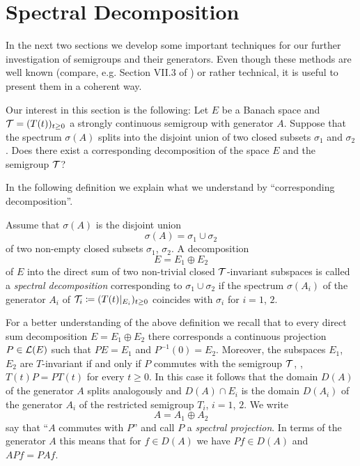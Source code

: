 \section{Spectral Decomposition}\label{sec:a3-3}
In the next two sections we develop some important techniques for our further investigation of semigroups and their generators.
Even though these methods are well known (compare, e.g. Section VII.3 of \citet{dunfordschwartz:1958}) or rather technical, it is useful to present them in a coherent way.

Our interest in this section is the following: Let $E$ be a Banach space and $\mathcal{T} = (T(t))_{t \geq 0}$ a strongly continuous semigroup with generator $A$.
Suppose that the spectrum $\sigma(A)$ splits into the disjoint union of two closed subsets $\sigma_{1}$ and $\sigma_{2}$.
Does there exist a corresponding decomposition of the space $E$ and the semigroup $\mathcal{T}$?

In the following definition we explain what we understand by \enquote{corresponding decomposition}.
\begin{definition}\label{def:a3-3.1}
Assume that $\sigma(A)$ is the disjoint union
\[
\sigma(A) = \sigma_{1} \cup \sigma_{2}
\]
of two non-empty closed subsets $\sigma_{1}$, $\sigma_{2}$.
A decomposition
\[
E = E_{1} \oplus E_{2}
\]
of $E$ into the direct sum of two non-trivial closed $\mathcal{T}$-invariant subspaces is called a \emph{spectral decomposition} corresponding to $\sigma_{1} \cup \sigma_{2}$ if the spectrum $\sigma(A_{i})$ of the generator $A_{i}$ of $\mathcal{T}_{i} \coloneqq (T(t)|_{E_{i}})_{t \geq 0}$ coincides with $\sigma_{i}$ for $i = 1$, $2$.
\end{definition}
For a better understanding of the above definition we recall that to every direct sum decomposition $E = E_{1} \oplus E_{2}$ there corresponds a continuous projection $P \in \mathcal{L}(E)$ such that $PE = E_{1}$ and $P^{-1}(0) = E_{2}$.
Moreover, the subspaces $E_{1}$, $E_{2}$ are $T$-invariant if and only if $P$ commutes with the semigroup $\mathcal{T}$, \ie, $T(t)P = PT(t)$ for every $t \geq 0$.
In this case it follows that the domain $D(A)$ of the generator $A$ splits analogously and $D(A) \cap E_{i}$ is the domain $D(A_{i})$ of the generator $A_{i}$ of the restricted semigroup $T_{i}$, $i = 1$, $2$.
We write
\[
A = A_{1} \oplus A_{2}
\]
say that \enquote{$A$ commutes with $P$} and call $P$ a \emph{spectral projection}.
In terms of the generator $A$ this means that for $f \in D(A)$ we have $Pf \in D(A)$ and $APf = PAf$.

